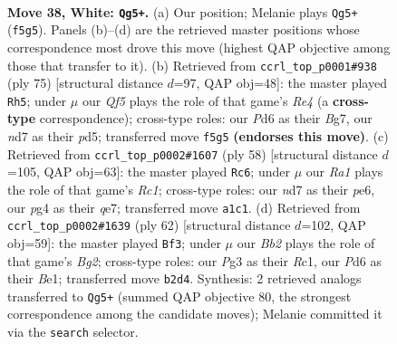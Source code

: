 \documentclass[11pt]{article}
\begin{document}
\clearpage

\begin{figure}[p]\centering
\begin{subfigure}{0.46\textwidth}\centering
\resizebox{\linewidth}{!}{%
\newchessgame
\chessboard[
  setfen={3q2k1/1b1n1p2/3P1n2/2p2Q1p/p5pP/6P1/PB3P2/R5K1 w - - 0 38},
  showmover=false,
  pgfstyle=straightmove, color=movearrow, markmove={f5-g5}
]}
\caption{}
\end{subfigure}\hfill
\begin{subfigure}{0.46\textwidth}\centering
\resizebox{\linewidth}{!}{%
\newchessgame
\chessboard[
  setfen={6k1/1b3pb1/3p2pp/qP1Pr3/4N2P/2NQ4/5PP1/2R3K1 b - - 0 38},
  showmover=false,
  pgfstyle=straightmove, color=movearrow, markmove={e5-h5}
]}
\caption{}
\end{subfigure}
\\[4pt]
\begin{subfigure}{0.46\textwidth}\centering
\resizebox{\linewidth}{!}{%
\newchessgame
\chessboard[
  setfen={3r4/4qppk/1p2pn1p/pB1nQ3/P2P4/7P/1P1B1PP1/2R3K1 w - - 12 30},
  showmover=false,
  pgfstyle=straightmove, color=movearrow, markmove={c1-c6}
]}
\caption{}
\end{subfigure}\hfill
\begin{subfigure}{0.46\textwidth}\centering
\resizebox{\linewidth}{!}{%
\newchessgame
\chessboard[
  setfen={4r1k1/5p2/1p3np1/1q1n3p/p2Q1P1P/3P2P1/5PB1/2R1B1K1 w - - 0 32},
  showmover=false,
  pgfstyle=straightmove, color=movearrow, markmove={g2-f3}
]}
\caption{}
\end{subfigure}
\caption{\textbf{Move 38, White: \texttt{Qg5+}.} (a) Our position; Melanie plays \texttt{Qg5+} (\texttt{f5g5}). Panels (b)--(d) are the retrieved master positions whose correspondence most drove this move (highest QAP objective among those that transfer to it). (b) Retrieved from \texttt{ccrl\_top\_p0001\#938} (ply 75) [structural distance $d$=97, QAP obj=48]: the master played \texttt{Rh5}; under $\mu$ our \emph{Qf5} plays the role of that game's \emph{Re4} (a \textbf{cross-type} correspondence); cross-type roles: our \emph{P}d6 as their \emph{B}g7, our \emph{n}d7 as their \emph{p}d5; transferred move \texttt{f5g5} \textbf{(endorses this move)}. (c) Retrieved from \texttt{ccrl\_top\_p0002\#1607} (ply 58) [structural distance $d$=105, QAP obj=63]: the master played \texttt{Rc6}; under $\mu$ our \emph{Ra1} plays the role of that game's \emph{Rc1}; cross-type roles: our \emph{n}d7 as their \emph{p}e6, our \emph{p}g4 as their \emph{q}e7; transferred move \texttt{a1c1}. (d) Retrieved from \texttt{ccrl\_top\_p0002\#1639} (ply 62) [structural distance $d$=102, QAP obj=59]: the master played \texttt{Bf3}; under $\mu$ our \emph{Bb2} plays the role of that game's \emph{Bg2}; cross-type roles: our \emph{P}g3 as their \emph{R}c1, our \emph{P}d6 as their \emph{B}e1; transferred move \texttt{b2d4}. Synthesis: 2 retrieved analogs transferred to \texttt{Qg5+} (summed QAP objective 80, the strongest correspondence among the candidate moves); Melanie committed it via the \texttt{search} selector.}
\label{fig:thought-m74}
\end{figure}
\end{document}
